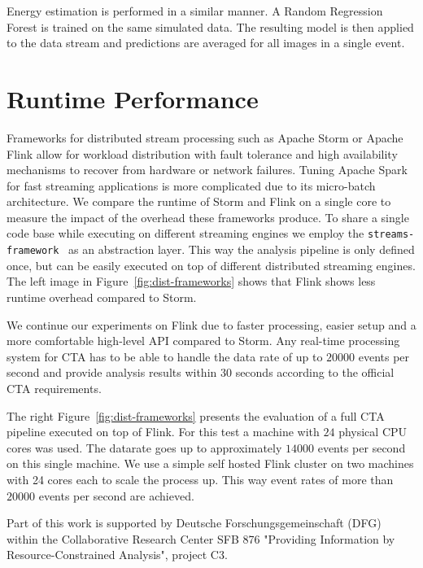 \documentclass[11pt,twoside]{article}
\begin{document}
Energy estimation is performed in a similar manner. A Random Regression Forest is trained on the same simulated data.
The resulting model is then applied to the data stream and predictions are averaged for all images in a single event.



\section{Runtime Performance}


Frameworks for distributed stream processing such as Apache Storm \citep{storm} or Apache Flink \citep{flink}
allow for workload distribution with fault tolerance and high availability mechanisms to recover from hardware or network failures.
Tuning Apache Spark for fast streaming applications is more complicated due to its micro-batch architecture.
We compare the runtime of Storm and Flink on a single core to measure the impact of the overhead these frameworks produce.
To share a single code base while executing on different streaming engines we employ the \texttt{streams-framework}~\citep{streams}
as an abstraction layer.
This way the analysis pipeline is only defined once, but can be easily executed on top of different distributed streaming engines.
The left image in Figure~\ref{fig:dist-frameworks} shows that Flink shows less runtime overhead compared to Storm.

We continue our experiments on Flink due to faster processing, easier setup and a more comfortable high-level API compared to Storm.
Any real-time processing system for CTA has to be able to handle the data rate of up to $20000$ events per second and provide analysis results
within 30 seconds according to the official CTA requirements.

The right Figure~\ref{fig:dist-frameworks} presents the evaluation of a full CTA pipeline executed on top of Flink.
For this test a machine with $24$ physical CPU cores was used.
The datarate goes up to approximately $14000$ events per second on this single machine.
We use a simple self hosted Flink cluster on two machines with 24 cores each to scale the process up.
This way event rates of more than $20 000$ events per second are achieved.


\acknowledgements Part of this work is supported by Deutsche Forschungsgemeinschaft (DFG) within the Collaborative Research Center SFB 876 "Providing Information by Resource-Constrained Analysis", project C3.


\end{document}
